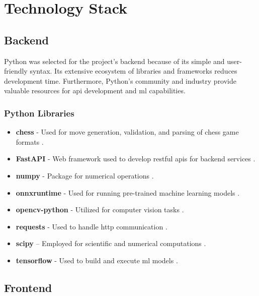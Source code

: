 \newpage

\section{Technology Stack}
\label{sec:technology-stack}

\subsection*{Backend}

Python was selected for the project’s backend because of its simple and user-friendly syntax. Its extensive ecosystem of libraries and frameworks reduces development time. Furthermore, Python’s community and industry provide valuable resources for \gls{api} development and \gls{ml} capabilities.

\subsubsection*{Python Libraries}

\begin{itemize}
    \item \textbf{chess} - Used for move generation, validation, and parsing of chess game formats \cite{python:chess}.
    \item \textbf{FastAPI} - Web framework used to develop \acrshort{rest}ful \glspl{api} for backend services \cite{python:fastapi}.
    \item \textbf{numpy} - Package for numerical operations \cite{python:numpy}.
    \item \textbf{onnxruntime} - Used for running pre-trained machine learning models \cite{python:onnx}.
    \item \textbf{opencv-python} - Utilized for computer vision tasks \cite{python:opencv}.
    \item \textbf{requests} - Used to handle \gls{http} communication \cite{python:requests}.
    \item \textbf{scipy} – Employed for scientific and numerical computations \cite{python:scipy}.
    \item \textbf{tensorflow} - Used to build and execute \gls{ml} models \cite{python:tensorflow}.
\end{itemize}


\subsection*{Frontend}

